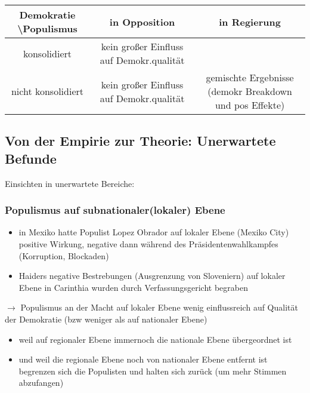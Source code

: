 \documentclass[11pt]{article}
\begin{document}
\begin{center}
\begin{tabular}{c|c|c}
Demokratie \textbackslash{Populismus} & in Opposition & in Regierung\\
\hline
konsolidiert & kein großer Einfluss auf Demokr.qualität & \\
nicht konsolidiert & kein großer Einfluss auf Demokr.qualität & gemischte Ergebnisse (demokr Breakdown und pos Effekte)\\
\end{tabular}
\end{center}

\subsection{Von der Empirie zur Theorie: Unerwartete Befunde}
\label{sec:org4ecf0ef}
Einsichten in unerwartete Bereiche:
\subsubsection{Populismus auf subnationaler(lokaler) Ebene}
\label{sec:org69dcbc8}
\begin{itemize}
\item in Mexiko hatte Populist Lopez Obrador auf lokaler Ebene (Mexiko City) positive Wirkung, negative dann während des Präsidentenwahlkampfes (Korruption, Blockaden)
\item Haiders negative Bestrebungen (Ausgrenzung von Sloveniern) auf lokaler Ebene in Carinthia wurden durch Verfassungsgericht begraben\\
\end{itemize}
\(\rightarrow\) Populismus an der Macht auf lokaler Ebene wenig einflussreich auf Qualität der Demokratie (bzw weniger als auf nationaler Ebene)
\begin{itemize}
\item weil auf regionaler Ebene immernoch die nationale Ebene übergeordnet ist
\item und weil die regionale Ebene noch von nationaler Ebene entfernt ist begrenzen sich die Populisten und halten sich zurück (um mehr Stimmen abzufangen)
\end{itemize}
\end{document}
